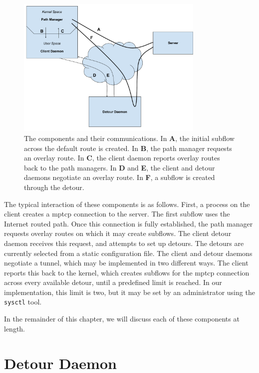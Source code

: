 \documentclass{cwru}
\begin{document}
\begin{figure}[h]
  \centering
  \includegraphics[width=0.8\textwidth]{figures/MovingParts.pdf}
  \caption[Interaction of client, detour, and server]{
    The components and their communications. In \textbf{A}, the initial subflow
    across the default route is created. In \textbf{B}, the path manager
    requests an overlay route. In \textbf{C}, the client daemon reports overlay
    routes back to the path managers. In \textbf{D} and \textbf{E}, the client
    and detour daemons negotiate an overlay route. In \textbf{F}, a subflow is
    created through the detour.
  }
  \label{f:MovingParts}
\end{figure}

The typical interaction of these components is as follows. First, a process on
the client creates a \ac{mptcp} connection to the server. The first subflow uses
the Internet routed path. Once this connection is fully established, the path
manager requests overlay routes on which it may create subflows. The client
detour daemon receives this request, and attempts to set up detours. The detours
are currently selected from a static configuration file. The client and detour
daemons negotiate a tunnel, which may be implemented in two different ways. The
client reports this back to the kernel, which creates subflows for the
\ac{mptcp} connection across every available detour, until a predefined limit is
reached. In our implementation, this limit is two, but it may be set by an
administrator using the \texttt{sysctl} tool.

In the remainder of this chapter, we will discuss each of these components at
length.

\section{Detour Daemon}
\end{document}
